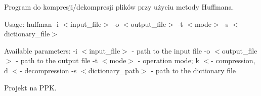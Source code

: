 Program do kompresji/dekompresji plików przy użyciu metody Huffmana.

Usage\+: huffman -\/i $<$input\+\_\+file$>$ -\/o $<$output\+\_\+file$>$ -\/t $<$mode$>$ -\/s $<$dictionary\+\_\+file$>$

Available parameters\+: -\/i $<$input\+\_\+file$>$ -\/ path to the input file -\/o $<$output\+\_\+file$>$ -\/ path to the output file -\/t $<$mode$>$ -\/ operation mode; k \texorpdfstring{$<$}{<}-\/ compression, d \texorpdfstring{$<$}{<}-\/ decompression -\/s $<$dictionary\+\_\+path$>$ -\/ path to the dictionary file

Projekt na PPK. 